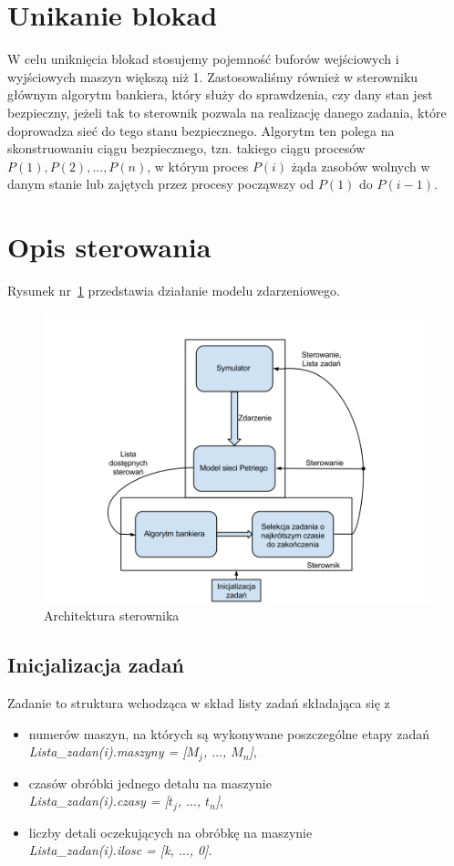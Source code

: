 \documentclass[10pt, a4paper]{article}
\begin{document}
\section{Unikanie blokad}
W celu uniknięcia blokad stosujemy pojemność buforów wejściowych i wyjściowych maszyn większą niż 1. Zastosowaliśmy również w sterowniku głównym algorytm bankiera, który służy do sprawdzenia, czy dany stan jest bezpieczny, jeżeli tak to sterownik pozwala na realizację danego zadania, które doprowadza sieć do tego stanu bezpiecznego. Algorytm ten polega na skonstruowaniu ciągu bezpiecznego, tzn. takiego ciągu procesów $P(1),P(2),...,P(n)$, w którym proces $P(i)$ żąda zasobów wolnych w danym stanie lub zajętych przez procesy począwszy od $P(1)$ do $P(i-1)$. 



\section{Opis sterowania}
Rysunek nr~\ref{fig:alg} przedstawia działanie modelu zdarzeniowego.
 \begin{figure}[H]
  \begin{center}
    \includegraphics[width=1\textwidth]{./obrazki/alg.png}
    \caption{Architektura sterownika}
    \label{fig:alg}
  \end{center}
 \end{figure}
\subsection{Inicjalizacja zadań}
Zadanie to struktura wchodząca w skład listy zadań składająca się z
\begin{itemize}
\item  numerów maszyn, na których są wykonywane poszczególne etapy zadań\\
\textit{Lista\_zadan(i).maszyny = [$M_j$, $\dots$,  $M_n$]},
\item czasów obróbki jednego detalu na maszynie\\
\textit{Lista\_zadan(i).czasy = [$t_j$, $\dots$,  $t_n$]},
\item liczby detali oczekujących na obróbkę na maszynie\\
\textit{Lista\_zadan(i).ilosc   = [k, $\dots$, 0]}.
\label{lista_zad}
\end{itemize}
\end{document}
